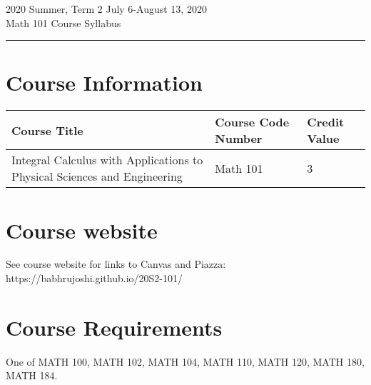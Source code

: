 \documentclass[12pt,usletter]{article} %
\begin{document}
\setlength{\parindent}{0pt}
\setlength{\parskip}{6pt}
\newcommand{\funky}{\hbox to 0pt{y}\hbox to 1ex{\hss'\hss}}
\newcommand{\musqueam}{\textipa{\sffamily x\textsuperscript{w}m\textschwa\texttheta k\textsuperscript{w}\textschwa\textvbaraccent y\textschwa m}}

\newcommand{\squamish}{\textipa{skw\textopeno:m\textsci\textesh}}
\newcommand{\squamalt}{S\underline{k}w\underline{x}w\'u7mesh}
\newcommand{\stolo}{\textipa{st\'o:l\=o}}
\newcommand{\tsleilwaututh}{\textipa{s\textschwa l'\'\i lw\textschwa ta\textglotstop}}


\begin{center}
\color{headbrown}
\LARGE{2020 Summer, Term 2 July 6-August 13, 2020}
\\
\medskip
\large{Math 101 Course Syllabus}
\\
\vskip -8pt
\rule{\textwidth}{2pt}
\end{center}

\color{textblue}

\section*{Course Information}

\begin{tabu} to \textwidth{ | X[l] | X[l] | X[l] | }
\hline 
\textbf{Course Title} & 
\textbf{Course Code Number} & 
\textbf{Credit Value} \\
\hline
 Integral Calculus with Applications to Physical Sciences
and Engineering & 
Math 101 & 
3 \\
\hline
\end{tabu}

\section*{Course website}
See course website for links to Canvas and Piazza: https://babhrujoshi.github.io/20S2-101/

\section*{Course Requirements}

One of MATH 100, MATH 102, MATH 104, MATH 110, MATH 120, MATH 180, MATH 184.
\end{document}
